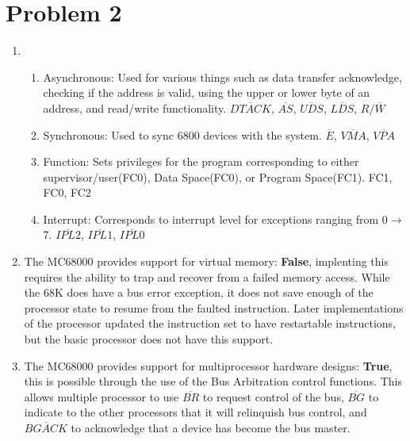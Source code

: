 \documentclass[12pt]{article}
\begin{document}
\section*{Problem 2}
\begin{enumerate}
\item
	\begin{enumerate}
	\item 	Asynchronous: Used for various things such as data transfer acknowledge, checking if the address is valid, using the upper or lower byte of an address, and read/write functionality. $\overline{DTACK}$, $\overline{AS}$, $\overline{UDS}$, $\overline{LDS}$, $R/\overline{W}$
	
	\item Synchronous: Used to sync 6800 devices with the system. $\overline{E}$, $\overline{VMA}$, $\overline{VPA}$
	
	\item Function: Sets privileges for the program corresponding to either supervisor/user(FC0), Data Space(FC0), or Program Space(FC1). FC1, FC0, FC2
	
	\item Interrupt: Corresponds to interrupt level for exceptions ranging from 0$\to$7. $\overline{IPL2}$, $\overline{IPL1}$, $\overline{IPL0}$
	\end{enumerate}
\item The MC68000 provides support for virtual memory: \textbf{False}, implenting this requires the ability to trap and recover from a failed memory access. While the 68K does have a bus error exception, it does not save enough of the processor state to resume from the faulted instruction. Later implementations of the processor updated the instruction set to have restartable instructions, but the basic processor does not have this support.

\item The MC68000 provides support for multiprocessor hardware designs: \textbf{True}, this is possible through the use of the Bus Arbitration control functions. This allows multiple processor to use $\overline{BR}$ to request control of the bus, $\overline{BG}$ to indicate to the other processors that it will relinquish bus control, and $\overline{BGACK}$ to acknowledge that a device has become the bus master.
\end{enumerate}
\end{document}
